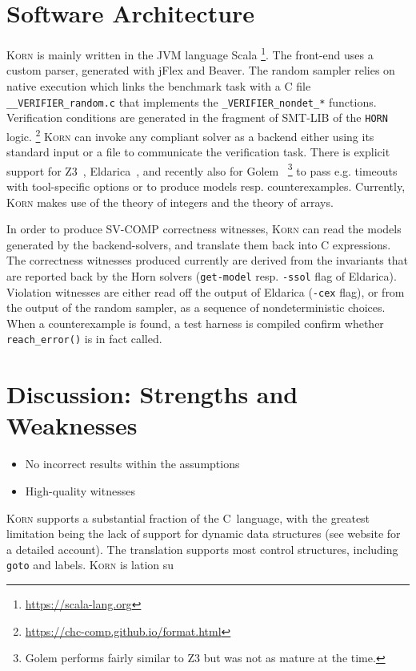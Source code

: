 \documentclass{llncs}
\newcommand{\Korn}{\textsc{Korn}\xspace}
\begin{document}
\section{Software Architecture}
\label{sec:architecture}

\Korn is mainly written in the JVM language Scala
    \footnote{\url{https://scala-lang.org}}.
The front-end uses a custom parser, generated with jFlex and Beaver.
The random sampler relies on native execution which links
the benchmark task with a C file \verb!__VERIFIER_random.c!
that implements the \verb!_VERIFIER_nondet_*! functions.
Verification conditions are generated in the fragment of SMT-LIB of the \texttt{HORN} logic.%
    \footnote{\url{https://chc-comp.github.io/format.html}}
\Korn can invoke any compliant solver as a backend either using its standard input or a file to communicate the verification task.
There is explicit support for Z3~\cite{gurfinkel2019science}, Eldarica~\cite{hojjat2018eldarica}, and recently also for Golem~\cite{blicha2022split}%
    \footnote{Golem performs fairly similar to Z3 but was not as mature at the time.}
to pass e.g. timeouts with tool-specific options or to produce models resp. counterexamples.
Currently, \Korn makes use of the theory of integers 
and the theory of arrays.

In order to produce SV-COMP correctness witnesses, \Korn can read the models generated by the backend-solvers, and translate them back into C expressions.
The correctness witnesses produced currently are derived from
the invariants that are reported back by the Horn solvers (\texttt{get-model} resp. \texttt{-ssol} flag of Eldarica).
Violation witnesses are either read off the output of Eldarica (\texttt{-cex} flag),
or from the output of the random sampler, as a sequence of nondeterministic choices.
When a counterexample is found, a test harness is compiled confirm whether \texttt{reach\_error()} is in fact called.

\section{Discussion: Strengths and Weaknesses}
\label{sec:discussion}

\begin{itemize}
\item No incorrect results within the assumptions
\item High-quality witnesses
\end{itemize}

\Korn supports a substantial fraction of the C~language, with the greatest limitation
being the lack of support for dynamic data structures (see website for a detailed account).
The translation supports most control structures, including \texttt{goto} and labels.
\Korn is lation su
\end{document}

